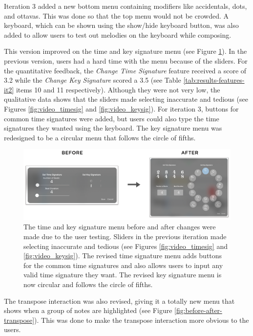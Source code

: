 				Iteration 3 added a new bottom menu containing modifiers like accidentals, dots, and ottavas. This was done so that the top menu would not be crowded. A keyboard, which can be shown using the show/hide keyboard button, was also added to allow users to test out melodies on the keyboard while composing. 

				This version improved on the time and key signature menu (see Figure \ref{fig:before-after-tsmenu}). In the previous version, users had a hard time with the menu because of the sliders. For the quantitative feedback, the \textit{Change Time Signature} feature received a score of 3.2 while the \textit{Change Key Signature} scored a 3.5 (see Table \ref{tab:results-features-it2} items 10 and 11 respectively). Although they were not very low, the qualitative data shows that the sliders made selecting inaccurate and tedious (see Figures \ref{fig:video_timesig} and \ref{fig:video_keysig}). For iteration 3, buttons for common time signatures were added, but users could also type the time signatures they wanted using the keyboard. The key signature menu was redesigned to be a circular menu that follows the circle of fifths. 

				\begin{figure}[H]
					\centering
					\includegraphics[scale=0.28]{figures/before-after-tsmenu}
				    \caption{The time and key signature menu before and after changes were made due to the user testing. Sliders in the previous iteration made selecting inaccurate and tedious (see Figures \ref{fig:video_timesig} and \ref{fig:video_keysig}). The revised time signature menu adds buttons for the common time signatures and also allows users to input any valid time signature they want. The revised key signature menu is now circular and follows the circle of fifths.}
				    \label{fig:before-after-tsmenu}
				\end{figure} 

				The transpose interaction was also revised, giving it a totally new menu that shows when a group of notes are highlighted (see Figure \ref{fig:before-after-transpose}). This was done to make the transpose interaction more obvious to the users.

